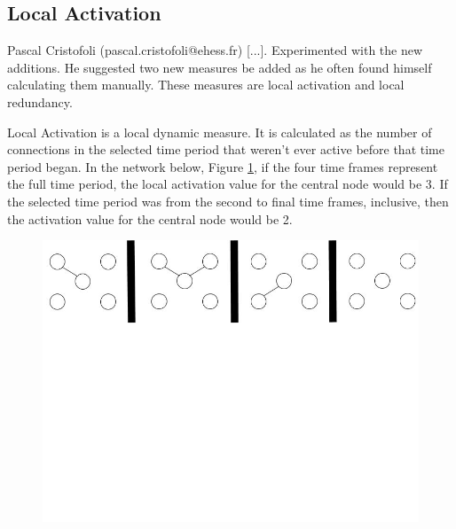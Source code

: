 \subsection{Local Activation}
\label{localActivationSection}

Pascal Cristofoli (pascal.cristofoli@ehess.fr) [...]. Experimented with the new additions. He suggested two new measures be added as he often found himself calculating them manually. These measures are local activation and local redundancy.

Local Activation is a local dynamic measure. It is calculated as the number of connections in the selected time period that weren't ever active before that time period began. In the network below, Figure \ref{localActivation1}, if the four time frames represent the full time period, the local activation value for the central node would be 3. If the selected time period was from the second to final time frames, inclusive, then the activation value for the central node would be 2.

\begin{figure}[h!]
  \begin{center}
  \includegraphics[trim={0 15cm 0 -1cm}, width=120mm]{./Figures/localActivation1.jpg}
  \end{center}
  \caption{}{}
  \label{localActivation1}
\end{figure}



